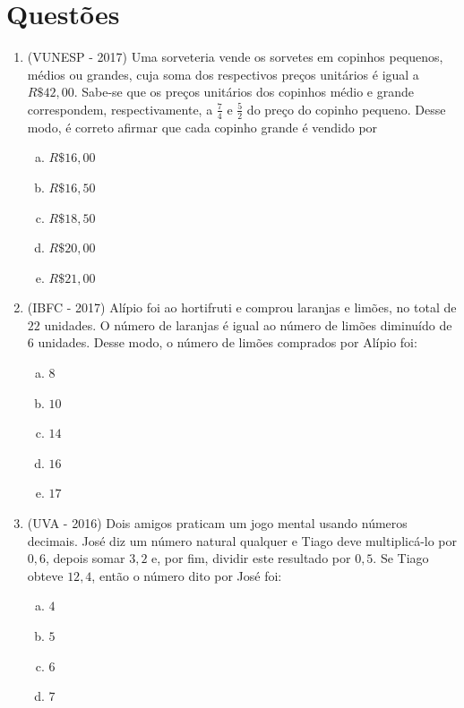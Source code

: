 \section{Questões}

\begin{enumerate}
 \item (VUNESP - 2017) Uma sorveteria vende os sorvetes em copinhos pequenos, médios ou grandes, cuja soma dos respectivos preços unitários é igual a $R\$ 42,00$. Sabe-se que os preços unitários dos copinhos médio e grande correspondem, respectivamente, a $\frac{7}{4}$ e $\frac{5}{2}$ do preço do copinho pequeno. Desse modo, é correto afirmar que cada copinho grande é vendido por
 \begin{multicols}{5}
 \begin{enumerate}[a)]
 \item $R\$ 16,00$
 \item $R\$ 16,50$
 \item $R\$ 18,50$
 \item $R\$ 20,00$
 \item $R\$ 21,00$
 \end{enumerate}
 \end{multicols}

 \item (IBFC - 2017) Alípio foi ao hortifruti e comprou laranjas e limões, no total de $22$ unidades. O número de laranjas é igual ao número de limões diminuído de $6$ unidades. Desse modo, o número de limões comprados por Alípio foi:
 \begin{multicols}{5}
 \begin{enumerate}[a)]
 \item $8$
 \item $10$
 \item $14$
 \item $16$
 \item $17$
 \end{enumerate}
 \end{multicols}

 \item (UVA - 2016) Dois amigos praticam um jogo mental usando números decimais. José diz um número natural qualquer e Tiago deve multiplicá-lo por $0,6$, depois somar $3,2$ e, por fim, dividir este resultado por $0,5$. Se Tiago obteve $12,4$, então o número dito por José foi:
 \begin{multicols}{5}
 \begin{enumerate}[a)]
 \item $4$
 \item $5$
 \item $6$
 \item $7$
 \end{enumerate}
 \end{multicols}


\end{enumerate}
